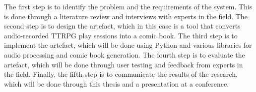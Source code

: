The first step is to identify the problem and the requirements of the system. This is done through a literature review and interviews with experts in the field. The second step is to design the artefact, which in this case is a tool that converts audio-recorded TTRPG play sessions into a comic book. The third step is to implement the artefact, which will be done using Python and various libraries for audio processing and comic book generation. The fourth step is to evaluate the artefact, which will be done through user testing and feedback from experts in the field. Finally, the fifth step is to communicate the results of the research, which will be done through this thesis and a presentation at a conference.
